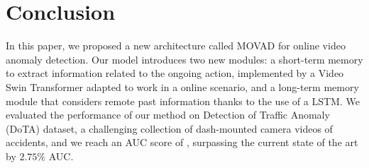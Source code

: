 \section{Conclusion}
\label{sec:conclusions}

In this paper, we proposed a new architecture called MOVAD for online  video anomaly detection.
Our model introduces two new modules: a short-term memory to extract information related to the ongoing action, implemented by a Video Swin Transformer adapted to work in a online scenario, and a long-term memory module that considers remote past information thanks to the use of a LSTM.
We evaluated the performance of our method on Detection of Traffic Anomaly (DoTA) dataset, a challenging collection of dash-mounted camera videos of accidents, and we reach an AUC score of , surpassing the current state of the art by $2.75\%$ AUC.